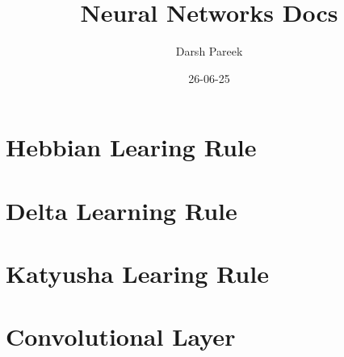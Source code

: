 \documentclass{article}
\title{Neural Networks Docs}
\date{26-06-25}
\author{Darsh Pareek}
\begin{document}
  \maketitle
  \newpage
  \section{Hebbian Learing Rule}
  
  \newpage
  \section{Delta Learning Rule}
  
  \newpage
  \section{Katyusha Learing Rule}
  
  \newpage
  \section{Convolutional Layer}
  
\end{document}
